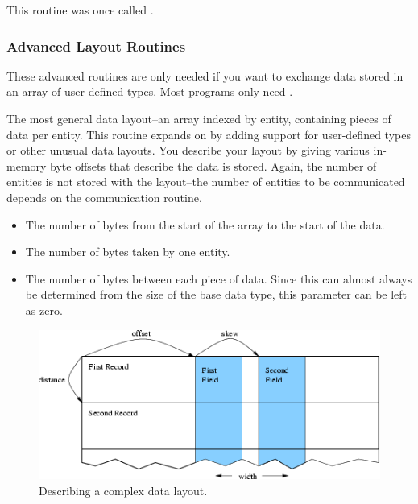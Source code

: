 This routine was once called .


\subsubsection{Advanced Layout Routines}
\label{sec:IDXL_Layout_offset}

These advanced routines are only needed if you want to exchange data stored in an array of user-defined types.  Most programs only need .


The most general data layout--an array indexed by entity, containing  pieces of data per entity.  This routine expands on  by adding support for user-defined types or other unusual data layouts.  You describe your layout by giving various in-memory byte offsets that describe the data is stored. Again, the number of entities is not stored with the layout--the number of entities to be communicated depends on the communication routine.

\begin{itemize}
  \item {} The number of bytes from the start of the array to the start of the data.
  \item {} The number of bytes taken by one entity.
  \item {} The number of bytes between each piece of data.  Since this can almost always be determined from the size of the base data type, this parameter can be left as zero.
\end{itemize}

\begin{figure}[h]
\begin{center}
\includegraphics[width=5in]{fig/layout}
\end{center}
\caption{Describing a complex data layout.}
\label{fig:layout}
\end{figure}

